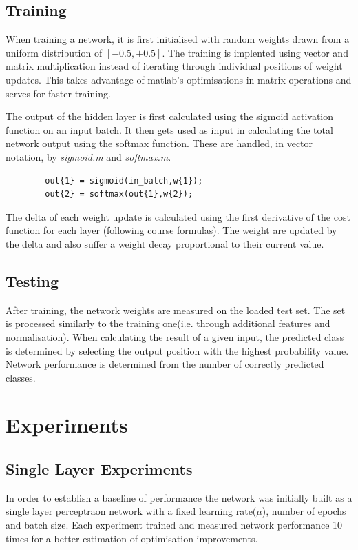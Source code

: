 \documentclass[11]{article}
\begin{document}
\subsection{Training}

When training a network, it is first initialised with random weights drawn from a uniform distribution of $[-0.5,+0.5]$. The training is implented using vector and matrix multiplication instead of iterating through individual positions of weight updates. This takes advantage of matlab's optimisations in matrix operations and serves for faster training. 

The output of the hidden layer is first calculated using the sigmoid activation function on an input batch. It then gets used as input in calculating the total network output using the softmax function. These are handled, in vector notation, by \emph{sigmoid.m} and \emph{softmax.m}.
\begin{lstlisting}
        out{1} = sigmoid(in_batch,w{1});
        out{2} = softmax(out{1},w{2});
\end{lstlisting}

The delta of each weight update is calculated using the first derivative of the cost function for each layer (following course formulas). The weight are updated by the delta and also suffer a weight decay proportional to their current value. 

\subsection{Testing}

After training, the network weights are measured on the loaded test set. The set is processed similarly to the training one(i.e. through additional features and normalisation). When calculating the result of a given input, the predicted class is determined by selecting the output position with the highest probability value. Network performance is determined from the number of correctly predicted classes. 

\section{Experiments}

\subsection{Single Layer Experiments}
In order to establish a baseline of performance the network was initially built as a single layer perceptraon network with a fixed learning rate($\mu$), number of epochs and batch size. Each experiment trained and measured network performance 10 times for a better estimation of optimisation improvements. 
\end{document}
